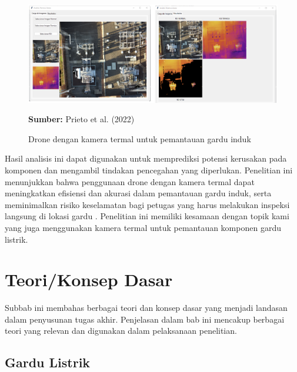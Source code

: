 \begin{figure} [H] \centering
  \includegraphics[scale=0.64]{gambar/bab2/drone.png}
  \caption{Drone dengan kamera termal untuk pemantauan gardu induk}
  \label{fig:Drone dengan kamera termal untuk pemantauan gardu induk}
  \footnotesize{\textbf{Sumber:} Prieto et al. (2022)}
\end{figure}

Hasil analisis ini dapat digunakan untuk memprediksi potensi kerusakan pada komponen dan mengambil tindakan pencegahan yang diperlukan. Penelitian ini menunjukkan bahwa penggunaan drone dengan kamera termal dapat meningkatkan efisiensi dan akurasi dalam pemantauan gardu induk, serta meminimalkan risiko keselamatan bagi petugas yang harus melakukan inspeksi langsung di lokasi gardu \cite{Prieto2022}. Penelitian ini memiliki kesamaan dengan topik kami yang juga menggunakan kamera termal untuk pemantauan komponen gardu listrik.

\section{Teori/Konsep Dasar}
Subbab ini membahas berbagai teori dan konsep dasar yang menjadi landasan dalam penyusunan tugas akhir. Penjelasan dalam bab ini mencakup berbagai teori yang relevan dan digunakan dalam pelaksanaan penelitian.

\subsection{Gardu Listrik}
\sloppy

